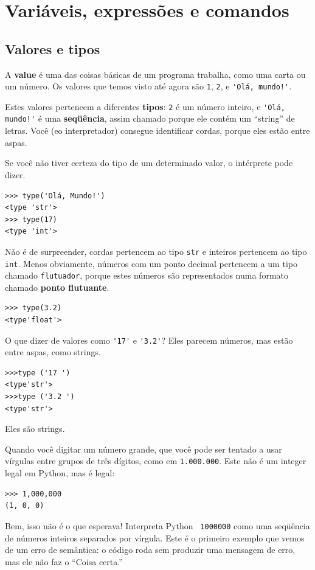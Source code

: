 \documentclass[10pt]{book}
\begin{document}
\chapter{Variáveis, expressões e comandos}

\section{Valores e tipos}

A {\bf value} é uma das coisas básicas de um programa trabalha,
como uma carta ou um
número. Os valores que temos visto até agora
são {\tt 1}, {\tt 2}, e
\verb"'Olá, mundo!'".

Estes valores pertencem a diferentes  {\bf tipos}:
{\tt 2} é um número inteiro, e \verb"'Olá, mundo!'" é uma {\bf seqüência},
assim chamado porque ele contém um ``string'' de letras.
Você (eo interpretador) consegue identificar
cordas, porque eles estão entre aspas.

Se você não tiver certeza do tipo de um determinado valor, o intérprete pode dizer.

\begin{verbatim}
>>> type('Olá, Mundo!')
<type 'str'>
>>> type(17)
<type 'int'>
\end{verbatim}
%
Não é de surpreender, cordas pertencem ao tipo {\tt str} e
inteiros pertencem ao tipo {\tt int}. Menos obviamente, números
com um ponto decimal pertencem a um tipo chamado {\tt flutuador},
porque estes números são representados numa
formato chamado {\bf ponto flutuante}.

\begin{verbatim}
>>> type(3.2)
<type'float'>
\end{verbatim}
%
O que dizer de valores como \verb"'17'" e \verb"'3.2'"?
Eles parecem números, mas estão entre aspas, como
strings.

\begin{verbatim}
>>>type ('17 ')
<type'str'>
>>>type ('3.2 ')
<type'str'>
\end{verbatim}
%
Eles são strings.

Quando você digitar um número grande, que você pode ser tentado a usar vírgulas
entre grupos de três dígitos, como em {\tt 1.000.000}. Este não é um
integer legal em Python, mas é legal:

\begin{verbatim}
>>> 1,000,000
(1, 0, 0)
\end{verbatim}
%
Bem, isso não é o que esperava! Interpreta Python {\tt
  1000000} como uma seqüência de números inteiros separados por vírgula.
Este é o primeiro exemplo que vemos de um erro de semântica: o código
roda sem produzir uma mensagem de erro, mas ele não faz o
``Coisa certa.''
\end{document}
